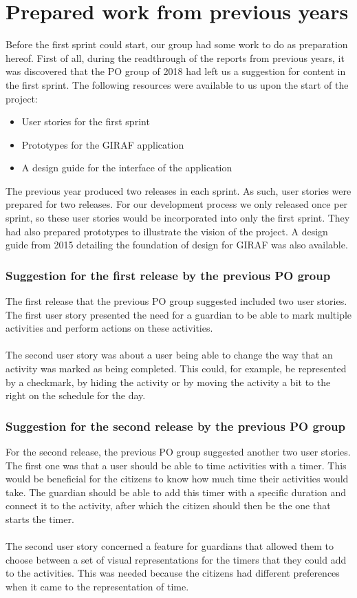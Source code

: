 \section{Prepared work from previous years}\label{prepared-work-from-previous-years}
Before the first sprint could start, our group had some work to do as preparation hereof.
First of all, during the readthrough of the reports from previous years, it was discovered that the PO group of 2018 had left us a suggestion for content in the first sprint.
The following resources were available to us upon the start of the project:
\begin{itemize}
    \item User stories for the first sprint
    \item Prototypes for the GIRAF application
    \item A design guide for the interface of the application
\end{itemize}
The previous year produced two releases in each sprint.
As such, user stories were prepared for two releases.
For our development process we only released once per sprint, so these user stories would be incorporated into only the first sprint.
They had also prepared prototypes to illustrate the vision of the project.
A design guide from 2015 detailing the foundation of design for GIRAF was also available. 

\subsubsection{Suggestion for the first release by the previous PO group}
The first release that the previous PO group suggested included two user stories.
The first user story presented the need for a guardian to be able to mark multiple activities and perform actions on these activities.
\\\\
The second user story was about a user being able to change the way that an activity was marked as being completed.
This could, for example, be represented by a checkmark, by hiding the activity or by moving the activity a bit to the right on the schedule for the day.

\subsubsection{Suggestion for the second release by the previous PO group}
For the second release, the previous PO group suggested another two user stories.
The first one was that a user should be able to time activities with a timer.
This would be beneficial for the citizens to know how much time their activities would take.
The guardian should be able to add this timer with a specific duration and connect it to the activity, after which the citizen should then be the one that starts the timer.
\\\\
The second user story concerned a feature for guardians that allowed them to choose between a set of visual representations for the timers that they could add to the activities.
This was needed because the citizens had different preferences when it came to the representation of time.


